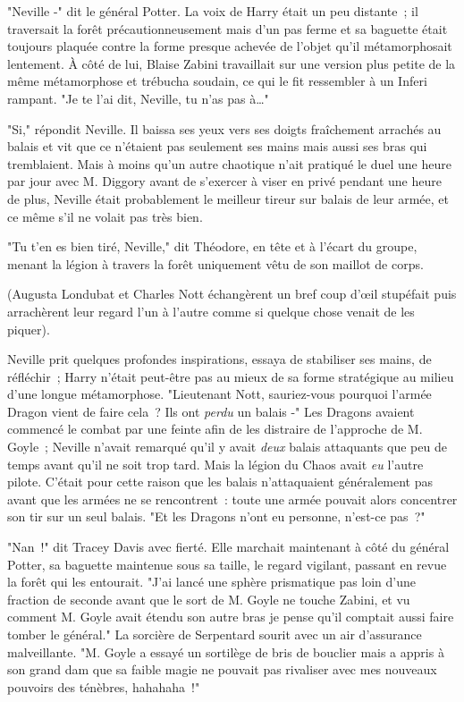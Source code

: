 "Neville -" dit le général Potter. La voix de Harry était un peu distante~; il traversait la forêt précautionneusement mais d'un pas ferme et sa baguette était toujours plaquée contre la forme presque achevée de l'objet qu'il métamorphosait lentement. À côté de lui, Blaise Zabini travaillait sur une version plus petite de la même métamorphose et trébucha soudain, ce qui le fit ressembler à un Inferi rampant. "Je te l'ai dit, Neville, tu n'as pas à…"

"Si," répondit Neville. Il baissa ses yeux vers ses doigts fraîchement arrachés au balais et vit que ce n'étaient pas seulement ses mains mais aussi ses bras qui tremblaient. Mais à moins qu'un autre chaotique n'ait pratiqué le duel une heure par jour avec M. Diggory avant de s'exercer à viser en privé pendant une heure de plus, Neville était probablement le meilleur tireur sur balais de leur armée, et ce même s'il ne volait pas très bien.

"Tu t'en es bien tiré, Neville," dit Théodore, en tête et à l'écart du groupe, menant la légion à travers la forêt uniquement vêtu de son maillot de corps.

(Augusta Londubat et Charles Nott échangèrent un bref coup d'œil stupéfait puis arrachèrent leur regard l'un à l'autre comme si quelque chose venait de les piquer).

Neville prit quelques profondes inspirations, essaya de stabiliser ses mains, de réfléchir~; Harry n'était peut-être pas au mieux de sa forme stratégique au milieu d'une longue métamorphose. "Lieutenant Nott, sauriez-vous pourquoi l'armée Dragon vient de faire cela~? Ils ont \emph{perdu} un balais -" Les Dragons avaient commencé le combat par une feinte afin de les distraire de l'approche de M. Goyle~; Neville n'avait remarqué qu'il y avait \emph{deux} balais attaquants que peu de temps avant qu'il ne soit trop tard. Mais la légion du Chaos avait \emph{eu} l'autre pilote. C'était pour cette raison que les balais n'attaquaient généralement pas avant que les armées ne se rencontrent~: toute une armée pouvait alors concentrer son tir sur un seul balais. "Et les Dragons n'ont eu personne, n'est-ce pas~?"

"Nan~!" dit Tracey Davis avec fierté. Elle marchait maintenant à côté du général Potter, sa baguette maintenue sous sa taille, le regard vigilant, passant en revue la forêt qui les entourait. "J'ai lancé une sphère prismatique pas loin d'une fraction de seconde avant que le sort de M. Goyle ne touche Zabini, et vu comment M. Goyle avait étendu son autre bras je pense qu'il comptait aussi faire tomber le général." La sorcière de Serpentard sourit avec un air d'assurance malveillante. "M. Goyle a essayé un sortilège de bris de bouclier mais a appris à son grand dam que sa faible magie ne pouvait pas rivaliser avec mes nouveaux pouvoirs des ténèbres, hahahaha~!"

